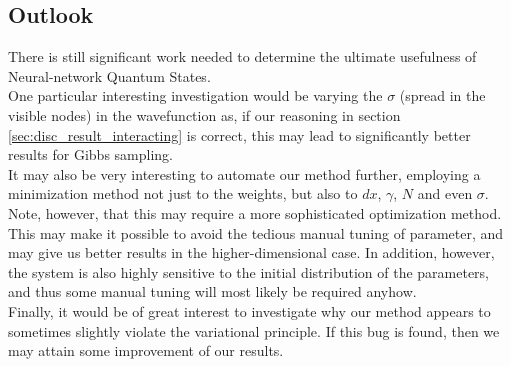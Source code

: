 \documentclass[a4paper, 10pt]{article}
\begin{document}
\subsection{Outlook}
There is still significant work needed to determine the ultimate usefulness of Neural-network Quantum States.\\
\linebreak
One particular interesting investigation would be varying the $\sigma$ (spread in the visible nodes) in the wavefunction as, if our reasoning in section \ref{sec:disc_result_interacting} is correct, this may lead to significantly better results for Gibbs sampling.\\
\linebreak
It may also be very interesting to automate our method further, employing a minimization method not just to the weights, but also to $dx$, $\gamma$, $N$ and even $\sigma$. Note, however, that this may require a more sophisticated optimization method. This may make it possible to avoid the tedious manual tuning of parameter, and may give us better results in the higher-dimensional case. In addition, however, the system is also highly sensitive to the initial distribution of the parameters, and thus some manual tuning will most likely be required anyhow.\\
\linebreak
Finally, it would be of great interest to investigate why our method appears to sometimes slightly violate the variational principle. If this bug is found, then we may attain some improvement of our results.
\clearpage
\end{document}
